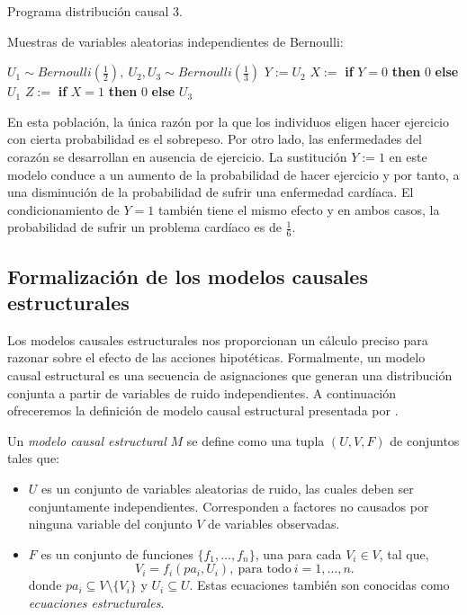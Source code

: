 \documentclass[oneside,openright,titlepage,numbers=noenddot,openany,headinclude,footinclude=true,
cleardoublepage=empty,abstractoff,BCOR=5mm,paper=a4,fontsize=12pt,main=spanish]{scrreprt}
\begin{document}
\begin{algorithm}[h]
\caption{Programa distribución causal 3.}
    Muestras de variables aleatorias independientes de Bernoulli:
     
    $U_1 \sim  Bernoulli\left(\frac{1}{2}\right), \ U_2,U_3 \sim  Bernoulli\left(\frac{1}{3}\right)$\;
    $Y:=U_2$\;
    $X:=$ \textbf{if} $Y=0$ \textbf{then} $0$ \textbf{else} $U_1$\;
    $Z:=$ \textbf{if} $X=1$ \textbf{then} $0$ \textbf{else} $U_3$\;
    \label{alg:programa3}
\end{algorithm}

En esta población, la única razón por la que los individuos eligen hacer ejercicio con cierta probabilidad es el sobrepeso. Por otro lado, las enfermedades del corazón se desarrollan en ausencia de ejercicio. La sustitución $Y := 1$ en este modelo conduce a un aumento de la probabilidad de hacer ejercicio y por tanto, a una disminución de la probabilidad de sufrir una enfermedad cardíaca. El condicionamiento de $Y = 1$ también tiene el mismo efecto y en ambos casos, la probabilidad de sufrir un problema cardíaco es de  $\frac{1}{6}$.

\subsection{Formalización de los modelos causales estructurales}

Los modelos causales estructurales nos proporcionan un cálculo preciso para razonar sobre el efecto de las acciones hipotéticas. Formalmente, un modelo causal estructural es una secuencia de asignaciones que generan una distribución conjunta a partir de variables de ruido independientes. A continuación ofreceremos la definición de modelo causal estructural presentada por \cite{causality2000}.\\

\begin{definition} \label{def:modcausalest}
Un \textit{modelo causal estructural} $M$ se define como una tupla $(U,V,F)$ de conjuntos tales que:
\begin{itemize}
    \item $U$ es un conjunto de variables aleatorias de ruido, las cuales deben ser conjuntamente independientes. Corresponden a factores no causados por ninguna variable del conjunto $V$ de variables observadas.
    \item $F$ es un conjunto de funciones $\{f_1,\dots,f_n\}$, una para cada $V_i\in V$, tal que, $$V_i=f_i(pa_i,U_i), \ \text{para todo} \ i=1,\dots,n.$$
    donde $pa_i \subseteq V \setminus \{V_i\}$ y $U_i \subseteq U$. Estas ecuaciones también son conocidas como \textit{ecuaciones estructurales}.
\end{itemize}
\end{definition}\
\end{document}
